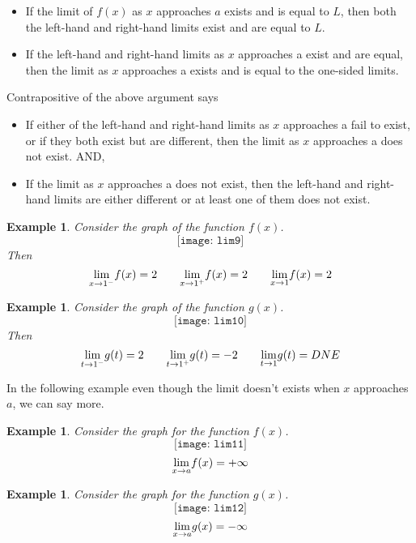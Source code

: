 \documentclass[12pt,a4paper]{book}
\newtheorem{Example}[theorem]{Example}
\numberwithin{equation}{section}
\begin{document}
\begin{itemize}
	\item If the limit of $f(x)$ as $x$ approaches $a$ exists and is equal to $L$, then both the left-hand
and right-hand limits exist and are equal to $L$. 
\item 
 If the left-hand and right-hand limits as $x$ 
 approaches a exist and are equal, then the
limit as $x$ approaches a exists and is equal to the one-sided limits.
\end{itemize}
Contrapositive of the above argument says
\begin{itemize}
\item If either of the left-hand and right-hand limits as $x$ approaches a fail to exist, or if
they both exist but are different, then the limit as $x$ approaches a does not exist.
AND,
\item If the limit as $x$ approaches a does not exist, then the left-hand and right-hand limits
are either different or at least one of them does not exist.
\end{itemize}

\begin{Example} Consider the graph of the function $f(x)$.
		$$
	\texttt{[image: lim9]}
	$$
	Then 
	$$
	\underset{x\rightarrow 1^-}{\rm lim}f(x)=2  \quad \quad 
	\underset{x\rightarrow 1^+}{\rm lim}f(x)= 2 \quad \quad  	\underset{x\rightarrow 1}{\rm lim}f(x)=2
	$$
\end{Example}
\begin{Example} Consider the graph of the function $g(x)$.
	$$
	\texttt{[image: lim10]}
	$$
	Then 
	$$
	\underset{t\rightarrow 1^-}{\rm lim}g(t)=2  \quad \quad 
	\underset{t\rightarrow 1^+}{\rm lim}g(t)= -2 \quad \quad  	\underset{t\rightarrow 1}{\rm lim}g(t)=DNE
	$$
\end{Example}
In the following example even though the limit doesn't exists when $x$ approaches $a$, we can say more. 
\begin{Example}
	Consider the graph for the function $f(x)$.
		$$
	\texttt{[image: lim11]}
	$$
	$$
	  	\underset{x\rightarrow a}{\rm lim}f(x)=+\infty
	$$
\end{Example}

		
	\begin{Example}
		Consider the graph for the function $g(x)$.
		$$
		\texttt{[image: lim12]}
		$$
		$$
			\underset{x\rightarrow a}{\rm lim}g(x)=-\infty
		$$
	\end{Example}
\end{document}

